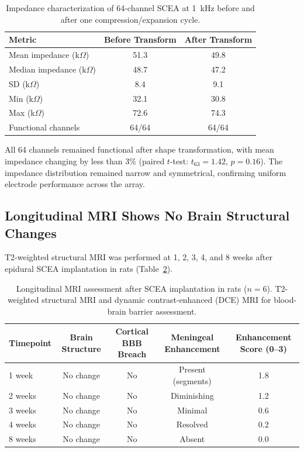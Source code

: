 \documentclass[11pt]{article}
\begin{document}
\begin{table}[H]
\centering
\caption{Impedance characterization of 64-channel SCEA at 1~kHz before and after one compression/expansion cycle.}
\label{tab:impedance}
\begin{tabular}{lcc}
\toprule
Metric & Before Transform & After Transform \\
\midrule
Mean impedance (k$\Omega$) & 51.3 & 49.8 \\
Median impedance (k$\Omega$) & 48.7 & 47.2 \\
SD (k$\Omega$) & 8.4 & 9.1 \\
Min (k$\Omega$) & 32.1 & 30.8 \\
Max (k$\Omega$) & 72.6 & 74.3 \\
Functional channels & 64/64 & 64/64 \\
\bottomrule
\end{tabular}
\end{table}

All 64 channels remained functional after shape transformation, with mean impedance changing by less than 3\% (paired $t$-test: $t_{63} = 1.42$, $p = 0.16$). The impedance distribution remained narrow and symmetrical, confirming uniform electrode performance across the array.

\subsection{Longitudinal MRI Shows No Brain Structural Changes}

T2-weighted structural MRI was performed at 1, 2, 3, 4, and 8 weeks after epidural SCEA implantation in rats (Table~\ref{tab:mri}).

\begin{table}[H]
\centering
\caption{Longitudinal MRI assessment after SCEA implantation in rats ($n = 6$). T2-weighted structural MRI and dynamic contrast-enhanced (DCE) MRI for blood-brain barrier assessment.}
\label{tab:mri}
\begin{tabular}{lcccc}
\toprule
Timepoint & Brain Structure & Cortical BBB Breach & Meningeal Enhancement & Enhancement Score (0--3) \\
\midrule
1 week & No change & No & Present (segments) & 1.8 \\
2 weeks & No change & No & Diminishing & 1.2 \\
3 weeks & No change & No & Minimal & 0.6 \\
4 weeks & No change & No & Resolved & 0.2 \\
8 weeks & No change & No & Absent & 0.0 \\
\bottomrule
\end{tabular}
\end{table}
\end{document}
